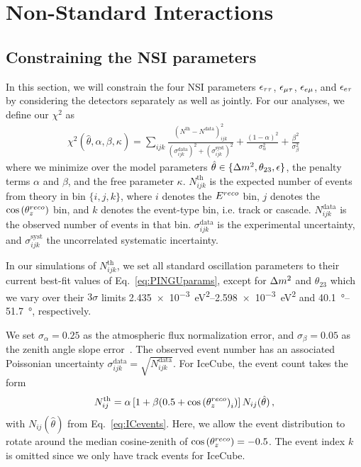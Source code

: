 \section{Non-Standard Interactions}\label{sec:nsiResults}
\subsection{Constraining the NSI parameters}\label{sec:constraining}
In this section, we will constrain the four NSI parameters $\epsilon_{\tau\tau}$, $\epsilon_{\mu\tau}$, $\epsilon_{e\mu}$, and $\epsilon_{e\tau}$ by considering the detectors separately as well as jointly.
For our analyses, we define our $\chi^2$ as
\begin{align}\label{eq:chisq_NSI}
    \chi^{2}(\hat{\theta},\alpha,\beta, \kappa)=\sum_{ijk} \frac{\left(N^\text{th}-N^\text{data}\right)_{ijk}^{2}}
    {\left(\sigma^\text{data}_{ijk}\right)^{2} + \left(\sigma^\text{syst}_{ijk}\right)^{2}}+ 
    \frac{(1-\alpha)^2}{\sigma_\alpha^2} + \frac{\beta^2}{\sigma_\beta^2}\,
\end{align}
where we minimize over the model parameters $\hat{\theta} \in \{\dm, \theta_{23}, \epsilon\}$, the penalty terms $\alpha$ and $\beta$, and the free parameter $\kappa$.
$N_{ijk}^\text{th}$ is the expected number of events from theory in bin $\{i,j,k\}$, where $i$ denotes the $E^{reco}$ bin, $j$ denotes the $\cos{(\theta_z^{reco})}$ bin,
and $k$ denotes the event-type bin, i.e. track or cascade. 
$N_{ijk}^\text{data}$ is the observed number of events in that bin. $\sigma^\text{data}_{ijk}$ is the experimental uncertainty, and $\sigma^\text{syst}_{ijk}$ the uncorrelated systematic
incertainty.

In our simulations of $N_{ijk}^\text{th}$, we set all standard oscillation parameters to their current best-fit values of Eq.~\ref{eq:PINGUparams}, 
except for $\dm$ and $\theta_{23}$
which we vary over their $3\sigma$ limits \SIrange{2.435e-3}{2.598e-3}{\eV\squared} and \SIrange{40.1}{51.7}{\degree}, respectively.

We set $\sigma_\alpha = 0.25$ as the atmospheric flux normalization error, and $\sigma_\beta = 0.05$ as the zenith angle slope error~\cite{hondapaper}. 
The observed event number has an associated Poissonian uncertainty $\sigma_{ijk}^\text{data} = \sqrt{N_{ijk}^\text{data}}$.
For IceCube, the event count takes the form
\begin{align}
    N^\text{th}_{ij} = \alpha\left[1+\beta (0.5 + \cos{(\theta_z^{reco})}_i )\right] N_{ij}(\hat{\theta})\,,
\end{align}
with $N_{ij}(\hat{\theta})$ from Eq.~\ref{eq:ICevents}. Here, we allow the event distribution to rotate around the median cosine-zenith of $\cos{(\theta_z^{reco})} = -0.5$. 
The event index $k$ is omitted since we only have track events for IceCube.

